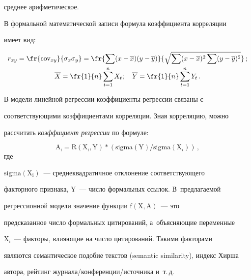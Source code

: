 среднее арифметическое.


  


  В формальной математической записи формула коэффициента корреляции 


имеет вид:


  \begin{gather*}


  r_{xy}=\fr{\mathrm{cov}_{xy}}{\sigma_x\sigma_y}=\fr{\sum (x-


\overline{x})(y-\overline{y})} {\sqrt{\sum (x-\overline{x})^2 \sum (y-


\overline{y})^2}}\,;\\


  \overline{X}=  \fr{1}{n}\sum\limits^n_{t=1} X_t; \quad \overline{Y}= \fr{1}{n} 


\sum\limits^n_{t=1} Y_t\,.


  \end{gather*}


  


  В модели линейной регрессии коэффициенты регрессии связаны с~


соответствующими коэффициентами корреляции. Зная корреляцию, можно 


рассчитать \textit{коэффициент регрессии} по формуле: 


$$


\mathrm{A_i}= 


\mathrm{R}\left(\mathrm{X_i},\mathrm{Y}\right)*\left(\mathrm{sigma}


(\mathrm{Y})/\mathrm{sigma}\left(\mathrm{X}_i\right)\right)\,,


$$ где 


$\mathrm{sigma}(\mathrm{X_i})$~--- среднеквадратичное отклонение соответствующего 


факторного признака, $\mathrm{Y}$~--- число формальных ссылок. В~предлагаемой 


регрессионной модели значение функции $\mathrm{f}(\mathrm{X},\mathrm{A})$~--- это 


предсказанное число формальных цитирований, а~объясняющие переменные 


$\mathrm{X_i}$~--- факторы, вли\-я\-ющие на чис\-ло цитирований. Такими факторами 


являются семантическое подобие текстов (semantic similarity), индекс Хирша 


автора, рейтинг жур\-на\-ла\!/\!кон\-фе\-рен\-ции\!/\!ис\-точ\-ни\-ка и~т.\,д.


